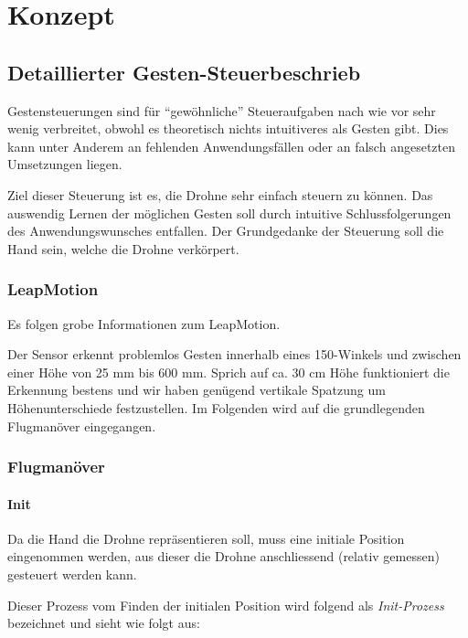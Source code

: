 \chapter{Konzept}

\section{Detaillierter Gesten-Steuerbeschrieb}

Gestensteuerungen sind für "`gewöhnliche"' Steueraufgaben nach wie vor sehr wenig verbreitet, obwohl es theoretisch nichts intuitiveres als Gesten gibt.
Dies kann unter Anderem an fehlenden Anwendungsfällen oder an falsch angesetzten Umsetzungen liegen.

Ziel dieser Steuerung ist es, die Drohne sehr einfach steuern zu können.
Das auswendig Lernen der möglichen Gesten soll durch intuitive Schlussfolgerungen des Anwendungswunsches entfallen.
Der Grundgedanke der Steuerung soll die Hand sein, welche die Drohne verkörpert.

\subsection{LeapMotion}
Es folgen grobe Informationen zum LeapMotion.

Der Sensor erkennt problemlos Gesten innerhalb eines 150\textdegree-Winkels und zwischen einer Höhe von 25 mm bis 600 mm.
Sprich auf ca. 30 cm Höhe funktioniert die Erkennung bestens und wir haben genügend vertikale Spatzung um Höhenunterschiede festzustellen.
Im Folgenden wird auf die grundlegenden Flugmanöver eingegangen.


\subsection{Flugmanöver}

\subsubsection{Init}

Da die Hand die Drohne repräsentieren soll, muss eine initiale Position eingenommen werden, aus dieser die Drohne anschliessend (relativ gemessen) gesteuert werden kann.

Dieser Prozess vom Finden der initialen Position wird folgend als \textit{Init-Prozess} bezeichnet und sieht wie folgt aus:

